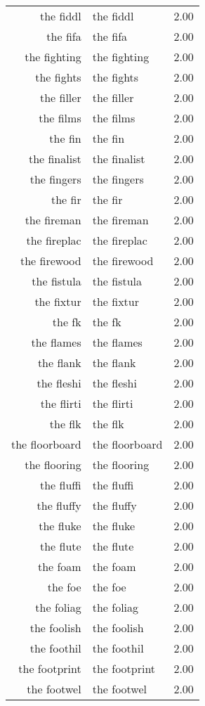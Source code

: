 \begin{table}[ht]
\begin{tabular}{rlr}
  the fiddl & the fiddl & 2.00 \\ 
  the fifa & the fifa & 2.00 \\ 
  the fighting & the fighting & 2.00 \\ 
  the fights & the fights & 2.00 \\ 
  the filler & the filler & 2.00 \\ 
  the films & the films & 2.00 \\ 
  the fin & the fin & 2.00 \\ 
  the finalist & the finalist & 2.00 \\ 
  the fingers & the fingers & 2.00 \\ 
  the fir & the fir & 2.00 \\ 
  the fireman & the fireman & 2.00 \\ 
  the fireplac & the fireplac & 2.00 \\ 
  the firewood & the firewood & 2.00 \\ 
  the fistula & the fistula & 2.00 \\ 
  the fixtur & the fixtur & 2.00 \\ 
  the fk & the fk & 2.00 \\ 
  the flames & the flames & 2.00 \\ 
  the flank & the flank & 2.00 \\ 
  the fleshi & the fleshi & 2.00 \\ 
  the flirti & the flirti & 2.00 \\ 
  the flk & the flk & 2.00 \\ 
  the floorboard & the floorboard & 2.00 \\ 
  the flooring & the flooring & 2.00 \\ 
  the fluffi & the fluffi & 2.00 \\ 
  the fluffy & the fluffy & 2.00 \\ 
  the fluke & the fluke & 2.00 \\ 
  the flute & the flute & 2.00 \\ 
  the foam & the foam & 2.00 \\ 
  the foe & the foe & 2.00 \\ 
  the foliag & the foliag & 2.00 \\ 
  the foolish & the foolish & 2.00 \\ 
  the foothil & the foothil & 2.00 \\ 
  the footprint & the footprint & 2.00 \\ 
  the footwel & the footwel & 2.00 \\ 

\end{tabular}
\end{table}
